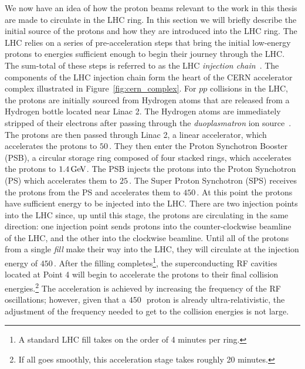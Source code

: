 We now have an idea of how the proton beams relevant to the work
in this thesis are made to circulate in the LHC ring.
In this section we will briefly describe the initial source of the protons and how
they are introduced into the LHC ring.
The LHC relies on a series of pre-acceleration steps that bring the initial
low-energy protons to energies sufficient enough to begin their journey through the LHC.
The sum-total of these steps is referred to as the LHC \textit{injection chain}~\cite{LHCDesignIII}.
The components of the LHC injection chain form the heart of the CERN accelerator
complex illustrated in Figure~\ref{fig:cern_complex}.
For $pp$ collisions in the LHC, the protons are initially sourced from Hydrogen atoms that are released
from a Hydrogen bottle located near Linac 2.
The Hydrogen atoms are immediately stripped of their electrons after passing through
the \textit{duoplasmatron} ion source~\cite{Duoplasma}.
The protons are then passed through Linac 2, a linear accelerator, which accelerates
the protons to $50$\,\MeV.
They then enter the Proton Synchotron Booster (PSB), a circular storage ring
composed of four stacked rings, which accelerates the protons to $1.4\,\text{Ge\kern -0.1em V}$.
The PSB injects the protons into the Proton Synchotron (PS) which accelerates
them to $25$\,\GeV.
The Super Proton Synchotron (SPS) receives the protons from the PS and
accelerates them to $450$\,\GeV.
At this point the protons have sufficient energy to be injected into the LHC.
There are two injection points into the LHC since, up until this stage,
the protons are circulating in the same direction: one injection point sends
protons into the counter-clockwise beamline of the LHC, and the other
into the clockwise beamline.
Until all of the protons from a single \textit{fill} make their way into
the LHC, they will circulate at the injection energy of $450$\,\GeV.
After the filling completes\footnote{A standard LHC fill takes on the order of 4 minutes per
ring.}, the superconducting RF cavities located at Point 4 will begin to accelerate the protons
to their final collision energies.\footnote{If all goes smoothly, this acceleration stage takes roughly 20 minutes.}
The acceleration is achieved by increasing the frequency of the RF oscillations; however,
given that a $450$\,\GeV~proton is already ultra-relativistic, the adjustment of the frequency
needed to get to the collision energies is not large.


